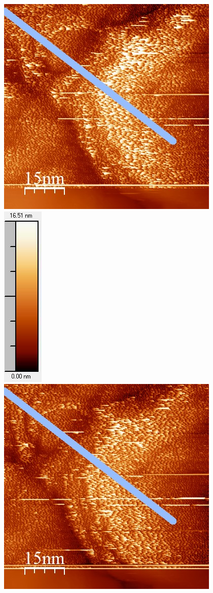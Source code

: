 \documentclass[12pt,a4paper]{article}
\begin{document}
\begin{figure}[H]
\centering
\includegraphics[scale=0.6]{Bilder/Anhang/IGain/11000_IGain_vor.jpg}
\includegraphics[scale=0.6]{Bilder/Anhang/IGain/11000_IGain_vor_Skala.jpg}
\includegraphics[scale=0.6]{Bilder/Anhang/IGain/11000_IGain_nach.jpg}

\end{figure}
\end{document}
